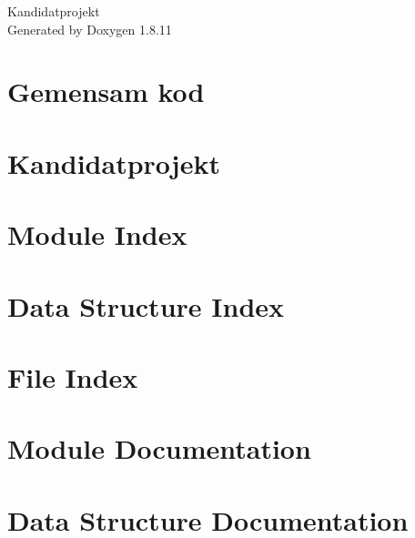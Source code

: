 \documentclass[twoside]{book}
\newcommand{\+}{\discretionary{\mbox{\scriptsize$\hookleftarrow$}}{}{}}
\newcommand{\clearemptydoublepage}{%
  \newpage{\pagestyle{empty}\cleardoublepage}%
}
\begin{document}
\hypersetup{pageanchor=false,
             bookmarksnumbered=true,
             pdfencoding=unicode
            }
\begin{titlepage}
\vspace*{7cm}
\begin{center}%
{\Large Kandidatprojekt }\\
\vspace*{1cm}
{\large Generated by Doxygen 1.8.11}\\
\end{center}
\end{titlepage}
\clearemptydoublepage
\tableofcontents
\clearemptydoublepage
{}
\hypersetup{pageanchor=true}

\chapter{Gemensam kod}
\label{index}\hypertarget{index}{}
\chapter{Kandidatprojekt}
\label{md_README}
\hypertarget{md_README}{}

\chapter{Module Index}

\chapter{Data Structure Index}

\chapter{File Index}

\chapter{Module Documentation}

\chapter{Data Structure Documentation}













\end{document}
